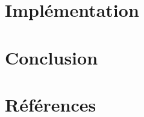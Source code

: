 \documentclass[a4paper, 12pt]{article}
\begin{document}
\section{Implémentation} %

\newpage

\section{Conclusion} %

\newpage

\section{Références} %


\end{document}
